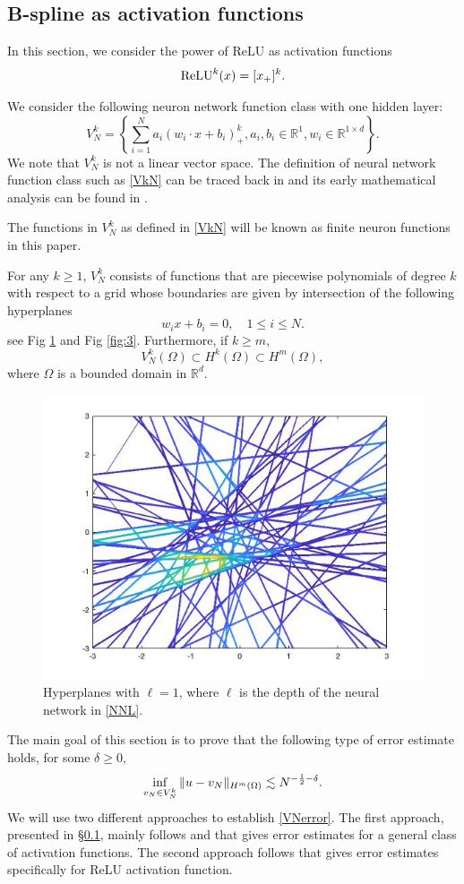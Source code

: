 \subsection{B-spline as activation functions}\label{sec:Bsplines}
In this section, we consider the power of ReLU as activation functions
\begin{equation}
  \label{relup}
{\rm ReLU}^k(x)=[x_+]^k. 
\end{equation} 


We consider the following neuron network function class 
with one hidden layer:
\begin{equation}
\label{VkN}
V_N^k=\left\{\sum_{i=1}^Na_i(w_i\cdot x+b_i)_+^k, a_i, b_i\in\mathbb R^1, w_i\in \mathbb R^{1\times d}\right\}.
\end{equation}
We note that $V_N^k$ is not a linear vector space.  The definition of
neural network function class such as \eqref{VkN} can be traced back
in \cite{mcculloch1943logical} and its early mathematical analysis can be found in \cite{hornik1989multilayer,cybenko1989approximation,funahashi1989approximate}.

The functions in $V^k_N$ as defined in \eqref{VkN} will be known as finite neuron functions in this paper.
\begin{lemma}
  For any $k\ge 1$, $V_N^k$ consists of functions that are piecewise
  polynomials of degree $k$ with respect to a grid whose boundaries are
  given by intersection of the following hyperplanes
$$
w_ix + b_i=0,\quad 1\le i\le N.
$$
see Fig \ref{fig:1} and Fig \ref{fig:3}. Furthermore, if $k\ge m$,
$$
V_N^k(\Omega)\subset H^k(\Omega)\subset H^m(\Omega),
$$
where $\Omega$ is a bounded domain in $\mathbb{R}^d$.
\end{lemma}
\begin{figure}[!ht]
\begin{center}
\includegraphics[width=.3\textwidth]{6dl/figures/dnn1-50.jpg}    
\end{center}
\caption{Hyperplanes with $\ell=1$, where $\ell$ is the depth of the neural network in \eqref{NNL}.}
\label{fig:1}
\end{figure} 		
 

The main goal of this section is to prove that the 
following type of error estimate holds, for some $\delta\ge 0$,
\begin{equation}\label{VNerror}
\inf_{v_N\in V_N^k}\|u- v_N \|_{H^m(\Omega)} \lesssim 
N^{-{1\over 2}-\delta}.
\end{equation} 
We will use two different approaches to establish \eqref{VNerror}.
The first approach, presented in \S\ref{sec:Bsplines}, mainly follows
\cite{hornik1994degree} and \cite{siegel2020approximations} that gives
error estimates for a general class of activation functions.  The
second approach follows
\cite{klusowski2016uniform} that gives error estimates specifically
for ReLU activation function.

